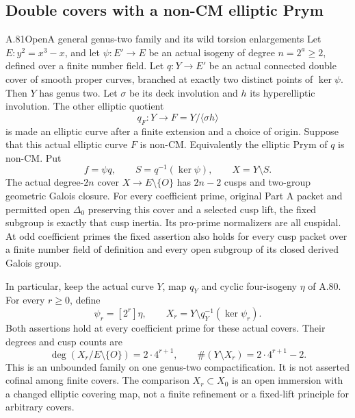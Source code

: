 \subsection{Double covers with a non-CM elliptic Prym}

\begin{statement}{A.81}{Open}{A general genus-two family and its wild torsion enlargements}
Let \(E:y^2=x^3-x\), and let
\(\psi:E'\to E\) be an actual isogeny of degree
\(n=2^a\ge2\), defined over a finite number field.
Let \(q:Y\to E'\) be an actual connected double cover
of smooth proper curves, branched at exactly two distinct
points of \(\ker\psi\). Then \(Y\) has genus two.
Let \(\sigma\) be its deck involution and \(h\) its
hyperelliptic involution. The other elliptic quotient
\[
                  q_F:Y\longrightarrow F=Y/\langle\sigma h\rangle
                                                        \tag{A.81.1}
\]
is made an elliptic curve after a finite extension and a
choice of origin. Suppose that this actual elliptic curve
\(F\) is non-CM. Equivalently the elliptic Prym of \(q\)
is non-CM. Put
\[
       f=\psi q,\qquad S=q^{-1}(\ker\psi),\qquad X=Y\setminus S.
                                                        \tag{A.81.2}
\]
The actual degree-\(2n\) cover \(X\to E\setminus\{O\}\)
has \(2n-2\) cusps and two-group geometric Galois closure.
For every coefficient prime, original Part A packet and
permitted open \(\Delta_0\) preserving this cover and a
selected cusp lift, the fixed subgroup is exactly that
cusp inertia. Its pro-prime normalizers are all cuspidal.
At odd coefficient primes the fixed assertion also holds
for every cusp packet over a finite number field of definition
and every open subgroup of its closed derived Galois group.

In particular, keep the actual curve \(Y\), map \(q_Y\)
and cyclic four-isogeny \(\eta\) of A.80. For every
\(r\ge0\), define
\[
 \psi_r=[2^r]\eta,\qquad
 X_r=Y\setminus q_Y^{-1}(\ker\psi_r).
                                                        \tag{A.81.3}
\]
Both assertions hold at every coefficient prime for these
actual covers. Their degrees and cusp counts are
\[
              \deg(X_r/E\setminus\{O\})=2\cdot4^{r+1},
              \qquad \#(Y\setminus X_r)=2\cdot4^{r+1}-2.
                                                        \tag{A.81.4}
\]
This is an unbounded family on one genus-two compactification.
It is not asserted cofinal among finite covers. The comparison
\(X_r\subset X_0\) is an open immersion with a changed
elliptic covering map, not a finite refinement or a fixed-lift
principle for arbitrary covers.
\end{statement}

